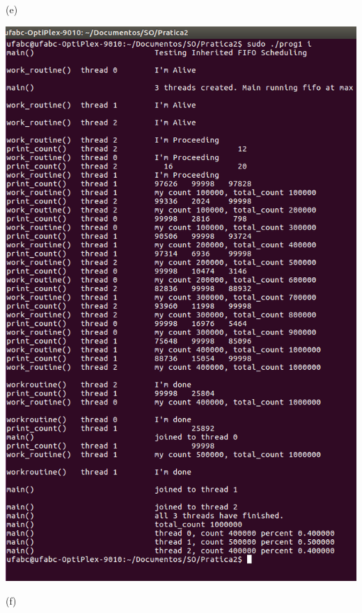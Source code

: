 \begin{minipage}{\textwidth}
\begin{minipage}[b]{0.32\textwidth}
        (e)
    \end{minipage}
    \hfill
    \begin{minipage}[b]{0.32\textwidth}
        \centering
        \includegraphics[trim=0 0 0 0,clip,scale=.25]{pratica2/prog1-i.png}
        
        (f)
    \end{minipage}
    \hspace{1em}
    \\[6pt]
    \hspace{-1em}
    \begin{minipage}{\textwidth}
        \centering
        \label{prog4modpng}
    \end{minipage}
    \hfill
\end{minipage}
\vspace{1em}

